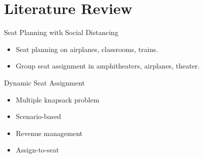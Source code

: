 
\section{Literature Review}
    \frame{\sectionpage}

    \begin{frame}{Seat Planning with Social Distancing}
      \begin{itemize}
        \item Seat planning on airplanes, classrooms, trains.
        \vspace*{2cm}
        \item Group seat assignment in amphitheaters, airplanes, theater.
      \end{itemize}
      \end{frame}
      
      \begin{frame}{Dynamic Seat Assignment}
        \begin{itemize}
          \item Multiple knapsack problem
          \item Scenario-based
          \item Revenue management
          \item Assign-to-seat 
        \end{itemize}
      \end{frame}